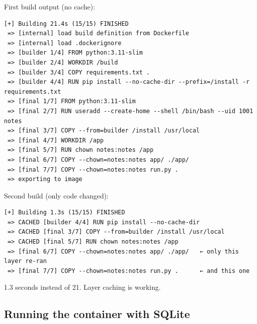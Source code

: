 \noindent{}First build output (no cache):

\begin{outputbox}[short]
\begin{Verbatim}[fontsize=\codesize, breaklines, breakanywhere, breaksymbolleft={\tiny\textcolor{muted}{$\hookrightarrow$}}]
[+] Building 21.4s (15/15) FINISHED
 => [internal] load build definition from Dockerfile
 => [internal] load .dockerignore
 => [builder 1/4] FROM python:3.11-slim
 => [builder 2/4] WORKDIR /build
 => [builder 3/4] COPY requirements.txt .
 => [builder 4/4] RUN pip install --no-cache-dir --prefix=/install -r requirements.txt
 => [final 1/7] FROM python:3.11-slim
 => [final 2/7] RUN useradd --create-home --shell /bin/bash --uid 1001 notes
 => [final 3/7] COPY --from=builder /install /usr/local
 => [final 4/7] WORKDIR /app
 => [final 5/7] RUN chown notes:notes /app
 => [final 6/7] COPY --chown=notes:notes app/ ./app/
 => [final 7/7] COPY --chown=notes:notes run.py .
 => exporting to image
\end{Verbatim}
\end{outputbox}

\noindent{}Second build (only code changed):

\begin{outputbox}[short]
\begin{Verbatim}[fontsize=\codesize, breaklines, breakanywhere, breaksymbolleft={\tiny\textcolor{muted}{$\hookrightarrow$}}]
[+] Building 1.3s (15/15) FINISHED
 => CACHED [builder 4/4] RUN pip install --no-cache-dir
 => CACHED [final 3/7] COPY --from=builder /install /usr/local
 => CACHED [final 5/7] RUN chown notes:notes /app
 => [final 6/7] COPY --chown=notes:notes app/ ./app/   ← only this layer re-ran
 => [final 7/7] COPY --chown=notes:notes run.py .      ← and this one
\end{Verbatim}
\end{outputbox}

\noindent{}1.3 seconds instead of 21. Layer caching is working.

\subsection*{Running the container with SQLite}\label{18-containerization:running-the-container-with-sqlite}

